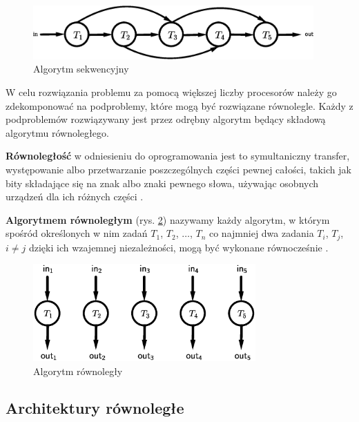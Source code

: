 \begin{figure}[h]
\centering
\includegraphics[width=29em]{images/Rys2.eps}
\caption{Algorytm sekwencyjny}
\label{fig:sequential}
\end{figure}

W celu rozwiązania problemu za pomocą większej liczby procesorów należy go zdekomponować na podproblemy, które mogą być rozwiązane równolegle. Każdy z podproblemów rozwiązywany jest przez odrębny algorytm będący składową algorytmu równoległego.


\begin{definicja}[Równoległość]\label{def:rownoleglosc}
\textbf{Równoległość} w odniesieniu do oprogramowania jest to symultaniczny transfer, występowanie albo przetwarzanie poszczególnych części pewnej całości, takich jak bity składające się na znak albo znaki pewnego słowa, używając osobnych urządzeń dla ich różnych części \cite{IEEE}.
\end{definicja}


\begin{definicja}\label{def:algorytm_rownolegly}
\textbf{Algorytmem równoległym} (rys. \ref{fig:parallel}) nazywamy każdy algorytm, w którym spośród określonych w nim zadań \(T_1\), \(T_2\), \(\dots\), \(T_n\) co najmniej dwa zadania \(T_i\), \(T_j\), \(i\neq j\) dzięki ich wzajemnej niezależności, mogą być wykonane równocześnie \cite{APC2011}.\\
\end{definicja}

\begin{figure}[h]
\centering
\includegraphics[width=23em]{images/Rys1.eps}
\caption{Algorytm równoległy}
\label{fig:parallel}
\end{figure}

\subsection{Architektury równoległe}

